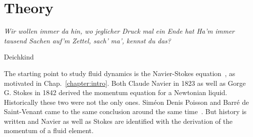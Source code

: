 \chapter{Theory}
\label{chapter:theory}
\epigraph{\textit{Wir wollen immer da hin, wo jeglicher Druck mal ein Ende hat
Ha'm immer tausend Sachen auf'm Zettel, sach' ma', kennst du das?}}{Deichkind}

The starting point to study fluid dynamics is the Navier-Stokes equation~\cite{claude-louis-marie-henriMemoireLoisMouvement1827, stokesSteadyMotionIncompressible1848}, as motivated in Chap.~\ref{chapter:intro}.
Both Claude Navier in 1823 as well as Gorge G. Stokes in 1842 derived the momentum equation for a Newtonian liquid.
Historically these two were not the only ones. 
Siméon Denis Poisson and Barré de Saint-Venant came to the same conclusion around the same time~\cite{poissonNouvelleTheorieAction1831, de1843notea, jrHistoryAerodynamicsIts1998}.
But history is written and Navier as well as Stokes are identified with the derivation of the momentum of a fluid element. 

